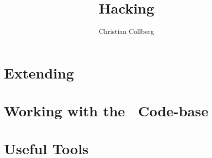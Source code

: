 \documentclass{book}
\title{Hacking \SM}
\author{Christian Collberg}
\begin{document}
\maketitle

\setcounter{secnumdepth}{1}
\tableofcontents

\chapter{Extending \SM}





\chapter{Working with the \SM\ Code-base}



\chapter{Useful Tools}



\end{document}
